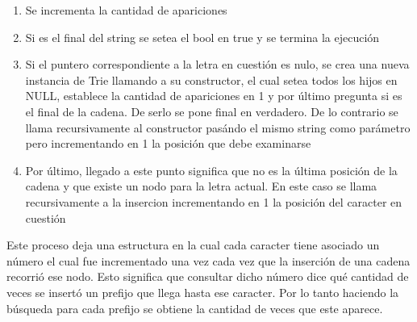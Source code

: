 \begin{enumerate}
	\item Se incrementa la cantidad de apariciones
	\item Si es el final del string se setea el bool en true y se termina la
	ejecución
	\item Si el puntero correspondiente a la letra en cuestión es nulo, se
	crea una nueva instancia de Trie llamando a su constructor, el cual setea
	todos los hijos en NULL, establece la cantidad de apariciones en 1 y por
	último pregunta si es el final de la cadena. De serlo se pone final en
	verdadero. De lo contrario se llama recursivamente al constructor pasándo
	el mismo string como parámetro pero incrementando en 1 la posición que
	debe examinarse
	\item Por último, llegado a este punto significa que no es la última
	posición de la cadena y que existe un nodo para la letra actual. En este
	caso se llama recursivamente a la insercion incrementando en 1 la
	posición del caracter en cuestión
\end{enumerate}

Este proceso deja una estructura en la cual cada caracter tiene asociado un
número el cual fue incrementado una vez cada vez que la inserción de una
cadena recorrió ese nodo. Esto significa que consultar dicho número dice
qué cantidad de veces se insertó un prefijo que llega hasta ese caracter.
Por lo tanto haciendo la búsqueda para cada prefijo se obtiene la cantidad de
veces que este aparece.